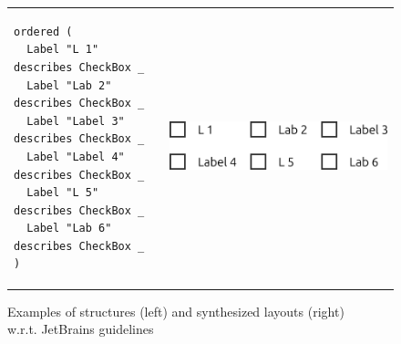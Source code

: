 \begin{figure}
\begin{tabular}{m{85mm}m{6cm}}
      \hline
      \begin{lstlisting}[basicstyle=\small]
ordered (
  Label "L 1"     describes CheckBox _
  Label "Lab 2"   describes CheckBox _
  Label "Label 3" describes CheckBox _
  Label "Label 4" describes CheckBox _
  Label "L 5"     describes CheckBox _
  Label "Lab 6"   describes CheckBox _
)
      \end{lstlisting} &
      \includegraphics[scale=0.4]{Example5-Qt-QML.png} \\
    \end{tabular}
    \caption{Examples of structures (left) and synthesized layouts (right)\\
      w.r.t. JetBrains guidelines}
    \label{fig:evaluation}
  \end{figure}
